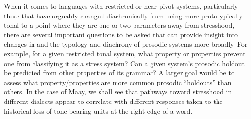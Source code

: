 \documentclass[output=paper,colorlinks,citecolor=brown]{langscibook}
\begin{document}


When it comes to languages with restricted or near pivot systems, particularly those that have arguably changed diachronically  from being more prototypically tonal to a point where they are one or two parameters away from stresshood, there are several important questions to be asked that can provide insight into changes in and the typology and diachrony of prosodic systems more broadly. For example, for a given restricted tonal system, what property or properties prevent one from classifying it as a stress system? Can a given system's prosodic holdout be predicted from other properties of its grammar? A larger goal would be to assess what property/properties are more common prosodic ``holdouts'' than others. In the case of Maay, we shall see that pathways toward stresshood in different dialects appear to correlate with different responses taken to the historical loss of tone bearing units at the right edge of a word.
\end{document}
